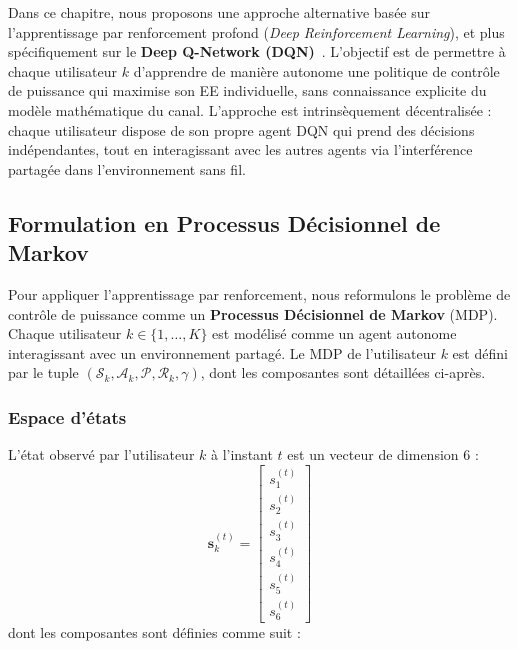 \documentclass[conference]{IEEEtran}
\begin{document}
Dans ce chapitre, nous proposons une approche alternative basée sur l'apprentissage par renforcement profond (\textit{Deep Reinforcement Learning}), et plus spécifiquement sur le \textbf{Deep Q-Network (DQN)}~\cite{mnih2015}. L'objectif est de permettre à chaque utilisateur $k$ d'apprendre de manière autonome une politique de contrôle de puissance qui maximise son EE individuelle, sans connaissance explicite du modèle mathématique du canal. L'approche est intrinsèquement décentralisée : chaque utilisateur dispose de son propre agent DQN qui prend des décisions indépendantes, tout en interagissant avec les autres agents via l'interférence partagée dans l'environnement sans fil.

\subsection{Formulation en Processus Décisionnel de Markov}
\label{sec:mdp}

Pour appliquer l'apprentissage par renforcement, nous reformulons le problème de contrôle de puissance comme un \textbf{Processus Décisionnel de Markov} (MDP). Chaque utilisateur $k \in \{1, \dots, K\}$ est modélisé comme un agent autonome interagissant avec un environnement partagé. Le MDP de l'utilisateur $k$ est défini par le tuple $(\mathcal{S}_k, \mathcal{A}_k, \mathcal{P}, \mathcal{R}_k, \gamma)$, dont les composantes sont détaillées ci-après.

\subsubsection{Espace d'états}
\label{sec:state_space}

L'état observé par l'utilisateur $k$ à l'instant $t$ est un vecteur de dimension 6 :
\begin{equation}
    \mathbf{s}_k^{(t)} = \begin{bmatrix}
        s_1^{(t)} \\ s_2^{(t)} \\ s_3^{(t)} \\ s_4^{(t)} \\ s_5^{(t)} \\ s_6^{(t)}
    \end{bmatrix}
    \label{eq:state_vector}
\end{equation}
dont les composantes sont définies comme suit :
\end{document}
